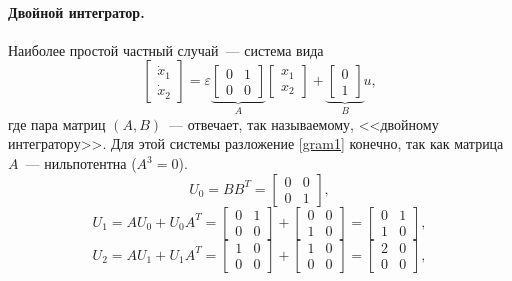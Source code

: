 \documentclass[../main.tex]{subfiles}
\begin{document}
 \paragraph{Двойной интегратор.}
 Наиболее простой частный случай~--- система вида 
 \begin{equation*}
	 \left[ {\begin{array}{*{20}{c}}
			 {{{\dot x}_1}}\\
			 {{{\dot x}_2}}
	 \end{array}} \right] = \varepsilon \underbrace {\left[ {\begin{array}{*{20}{c}}
				 0&1\\
				 0&0
		 \end{array}} \right]}_A\left[ {\begin{array}{*{20}{c}}
			 {{x_1}}\\
			 {{x_2}}
	 \end{array}} \right] + \underbrace {\left[ {\begin{array}{*{20}{c}}
				 0\\
				 1
		 \end{array}} \right]}_Bu,
 \end{equation*}
 где пара матриц $ (A,B) $~--- отвечает, так называемому, <<двойному интегратору>>.
 Для этой системы разложение \eqref{gram1} конечно, так как матрица $ A $~--- нильпотентна ($ A^3 = 0$).
 \begin{equation*}
	 U_0 = B B^T =  \left[ {\begin{array}{*{20}{c}}
			 0&0\\
			 0&1
	 \end{array}}\right],
 \end{equation*}
 \begin{equation*}
	 U_1 = A U_0 + U_0 A^T = \left[ {\begin{array}{*{20}{c}}
			 0&1\\
			 0&0
	 \end{array}}\right] + \left[ {\begin{array}{*{20}{c}}
			 0&0\\
			 1&0
	 \end{array}}\right] = \left[ {\begin{array}{*{20}{c}}
			 0&1\\
			 1&0
	 \end{array}}\right],
 \end{equation*}
 \begin{equation*}
	 U_2 = A U_1 + U_1 A^T = \left[ {\begin{array}{*{20}{c}}
			 1&0\\
			 0&0
	 \end{array}}\right] + \left[ {\begin{array}{*{20}{c}}
			 1&0\\
			 0&0
	 \end{array}}\right] = \left[ {\begin{array}{*{20}{c}}
			 2&0\\
			 0&0
	 \end{array}}\right],
 \end{equation*}
\end{document}
